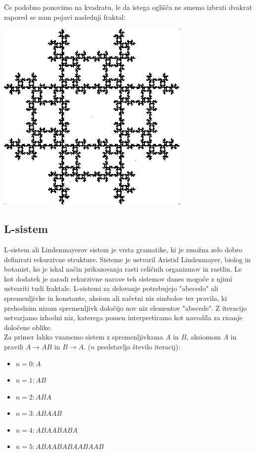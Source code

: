\documentclass[a4paper, 12px]{article}
\begin{document}
        Če podobno ponovimo na kvadratu, le da istega oglišča ne smemo izbrati dvakrat zapored se nam pojavi naslednji fraktal:
        \centerline{\includegraphics[scale=0.6]{square-fractal.PNG}}
        \begingroup
        \endgroup
    
    \subsection{L-sistem}
        L-sistem ali Lindenmayerov sistem je vrsta gramatike, ki je zmožna zelo dobro definirati rekurzivne strukture.
        Sisteme je ustvaril Aristid Lindenmayer, biolog in botanist, ko je iskal način prikazovanja rasti celičnih organizmov in rastlin.
        Le kot dodatek je zaradi rekurzivne narave teh sistemov danes mogoče z njimi ustvariti tudi fraktale.
        L-sistemi za delovanje potrebujejo "abecedo" ali spremenljivke in konstante, aksiom ali začetni niz simbolov ter pravila, ki prehodnim nizom spremenljivk določijo nov niz elementov "abecede".
        Z iteracijo ustvarjamo izhodni niz, katerega pomen interpretiramo kot navodila za risanje določene oblike.
        \cite{LSystem}\\

        Za primer lahko vzamemo sistem z spremenljivkama $A$ in $B$, aksiomom $A$ in pravili $A \rightarrow AB$ in $B \rightarrow A$. ($n$ predstavlja število iteracij):
        \begin{itemize}
            \item[] $n=0: A$
            \item[] $n=1: AB$
            \item[] $n=2: ABA$
            \item[] $n=3: ABAAB$
            \item[] $n=4: ABAABABA$
            \item[] $n=5: ABAABABAABAAB$
        \end{itemize}
\end{document}
